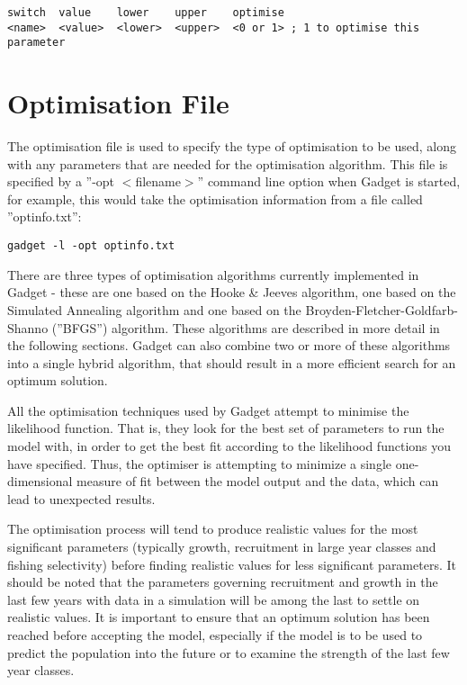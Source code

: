 \documentclass[10pt,twoside]{book}
\begin{document}
{\small\begin{verbatim}
switch  value    lower    upper    optimise
<name>  <value>  <lower>  <upper>  <0 or 1> ; 1 to optimise this parameter
\end{verbatim}}

\chapter{Optimisation File}\label{chap:optim}
The optimisation file is used to specify the type of optimisation to be used, along with any parameters that are needed for the optimisation algorithm.  This file is specified by a ''-opt $<$filename$>$'' command line option when Gadget is started, for example, this would take the optimisation information from a file called ''optinfo.txt'':

{\small\begin{verbatim}
gadget -l -opt optinfo.txt
\end{verbatim}}

There are three types of optimisation algorithms currently implemented in Gadget - these are one based on the Hooke \& Jeeves algorithm, one based on the Simulated Annealing algorithm and one based on the Broyden-Fletcher-Goldfarb-Shanno (''BFGS'') algorithm.  These algorithms are described in more detail in the following sections.  Gadget can also combine two or more of these algorithms into a single hybrid algorithm, that should result in a more efficient search for an optimum solution.

\bigskip
All the optimisation techniques used by Gadget attempt to minimise the likelihood function. That is, they look for the best set of parameters to run the model with, in order to get the best fit according to the likelihood functions you have specified.  Thus, the optimiser is attempting to minimize a single one-dimensional measure of fit between the model output and the data, which can lead to unexpected results.

\bigskip
The optimisation process will tend to produce realistic values for the most significant parameters (typically growth, recruitment in large year classes and fishing selectivity) before finding realistic values for less significant parameters.  It should be noted that the parameters governing recruitment and growth in the last few years with data in a simulation will be among the last to settle on realistic values.  It is important to ensure that an optimum solution has been reached before accepting the model, especially if the model is to be used to predict the population into the future or to examine the strength of the last few year classes.
\end{document}
